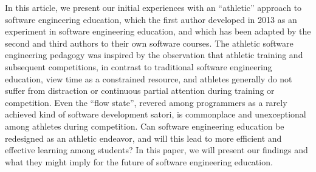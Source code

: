 In this article, we present our initial experiences with an ``athletic'' approach to software engineering education, which the first author developed in 2013 as an experiment in software engineering education, and which has been adapted by the second and third authors to their own software courses. The athletic software engineering pedagogy was inspired by the observation that athletic training and subsequent competitions, in contrast to traditional software engineering education, view time as a constrained resource, and athletes generally do not suffer from distraction or continuous partial attention during training or competition.  Even the ``flow state'', revered among programmers as a rarely achieved kind of software development satori, is  commonplace and unexceptional among athletes during competition. Can software engineering education be redesigned as an athletic endeavor, and will this lead to more efficient and effective learning among students?  In this paper, we will present our findings and what they might imply for the future of software engineering education. 









 